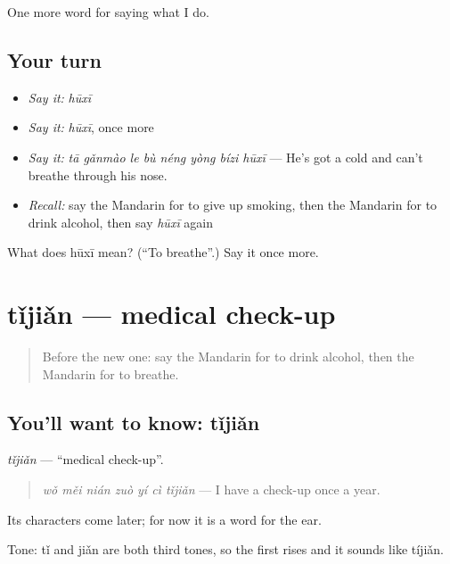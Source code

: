 \begin{grammarlens}[title={What you've built}]
One more word for saying what I do.
\end{grammarlens}

\subsection*{Your turn}
\begin{itemize}
\raggedright
  \item \emph{Say it:} \emph{hūxī}
  \item \emph{Say it:} \emph{hūxī}, once more
  \item \emph{Say it:} \emph{tā gǎnmào le bù néng yòng bízi hūxī} — He's got a cold and can't breathe through his nose.
  \item \emph{Recall:} say the Mandarin for to give up smoking, then the Mandarin for to drink alcohol, then say \emph{hūxī} again
\end{itemize}

\begin{tcolorbox}[breakable,colback=teal!4,colframe=teal!35!black,title={Before you move on}]
What does hūxī mean? (\textquotedblleft{}To breathe\textquotedblright{}.) Say it once more.
\end{tcolorbox}
\section[tǐjiǎn]{tǐjiǎn — medical check-up}

\label{lesson:ZH-C239-tijian}



\begin{quote}
Before the new one: say the Mandarin for to drink alcohol, then the Mandarin for to breathe.
\end{quote}

\subsection*{You'll want to know: tǐjiǎn}
\emph{tǐjiǎn} — \textquotedblleft{}medical check-up\textquotedblright{}.

\begin{quote}
\emph{wǒ měi nián zuò yí cì tǐjiǎn} — I have a check-up once a year.
\end{quote}

Its characters come later; for now it is a word for the ear.

Tone: tǐ and jiǎn are both third tones, so the first rises and it sounds like tíjiǎn.

